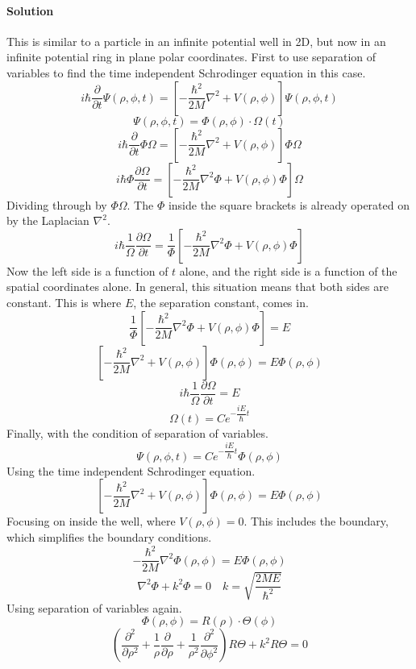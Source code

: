 \documentclass{article}
\begin{document}
{\begin{enumerate}
		\paragraph{Solution} This is similar to a particle in an infinite potential well in 2D, but now in an infinite potential ring in plane polar coordinates. First to use separation of variables to find the time independent Schrodinger equation in this case.
		\[
			i\hbar \frac{\partial}{\partial t} \Psi(\rho, \phi, t) = \left[ -\frac{\hbar^2}{2M} \nabla^2 + V(\rho, \phi) \right] \Psi(\rho, \phi, t)	
		\]
		\[
			\Psi(\rho, \phi, t) = \Phi(\rho, \phi) \cdot \Omega(t)
		\]
		\[
			i\hbar \frac{\partial}{\partial t} \Phi \Omega = \left[ -\frac{\hbar^2}{2M} \nabla^2 + V(\rho, \phi) \right] \Phi \Omega
		\]
		\[
			i\hbar \Phi \frac{\partial \Omega}{\partial t} = \left[ -\frac{\hbar^2}{2M} \nabla^2 \Phi + V(\rho, \phi) \Phi \right] \Omega
		\]
		Dividing through by $\Phi \Omega$. The $\Phi$ inside the square brackets is already operated on by the Laplacian $\nabla^2$.
		\[
			i\hbar \frac{1}{\Omega} \frac{\partial \Omega}{\partial t} = \frac{1}{\Phi} \left[ -\frac{\hbar^2}{2M} \nabla^2 \Phi + V(\rho, \phi) \Phi \right]
		\]
		Now the left side is a function of $t$ alone, and the right side is a function of the spatial coordinates alone. In general, this situation means that both sides are constant. This is where $E$, the separation constant, comes in.
		\[
			\frac{1}{\Phi} \left[ -\frac{\hbar^2}{2M} \nabla^2 \Phi + V(\rho, \phi) \Phi \right] = E	
		\]
		\[
			\left[ -\frac{\hbar^2}{2M} \nabla^2 + V(\rho, \phi) \right] \Phi(\rho, \phi) = E\Phi(\rho, \phi)
		\]
		\[
			i\hbar \frac{1}{\Omega} \frac{\partial \Omega}{\partial t} = E
		\]
		\[
			\Omega(t) = C e^{-\dfrac{iE}{\hbar} t}
		\]
		Finally, with the condition of separation of variables.
		\[
			\Psi(\rho, \phi, t) = C e^{-\dfrac{iE}{\hbar} t} \Phi(\rho, \phi)	
		\]
		Using the time independent Schrodinger equation.
		\[
			\left[ -\frac{\hbar^2}{2M} \nabla^2 + V(\rho, \phi) \right] \Phi(\rho, \phi) = E\Phi(\rho, \phi)
		\]
		Focusing on inside the well, where $V(\rho, \phi) = 0$. This includes the boundary, which simplifies the boundary conditions.
		\[
			-\frac{\hbar^2}{2M} \nabla^2 \Phi(\rho, \phi) = E\Phi(\rho, \phi)
		\]
		\[
			\nabla^2 \Phi + k^2 \Phi = 0 \quad k = \sqrt{ \frac{2ME}{\hbar^2} }
		\]
		Using separation of variables again.
		\[
			\Phi(\rho, \phi) = R(\rho) \cdot \Theta(\phi)	
		\]
		\[
			\left( \frac{\partial^2}{\partial \rho^2} + \frac{1}{\rho} \frac{\partial}{\partial \rho} + \frac{1}{\rho^2} \frac{\partial^2}{\partial \phi^2} \right) R \Theta + k^2 R \Theta = 0
\]
\end{enumerate}}
\end{document}

